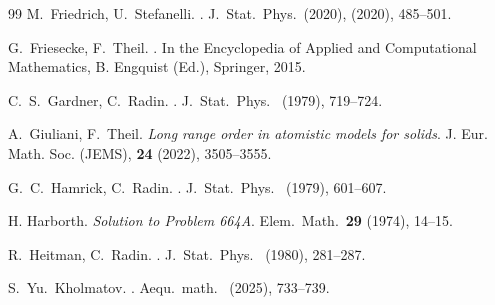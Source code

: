 \documentclass[reqno]{amsart}
\theoremstyle{plain}
\theoremstyle{definition}
\numberwithin{equation}{section}
\begin{document}
\begin{thebibliography}{99}
{\sc M.~Friedrich, U.~Stefanelli}. 
. 
\newblock J.\ Stat.\ Phys.\ (2020), 
 (2020),  485--501.

  




{\sc G.~Friesecke, F.~Theil}. 
. In the Encyclopedia of Applied and Computational Mathematics,
B. Engquist (Ed.), Springer, 2015.











 



{\sc C.~S.~Gardner, C.~Radin}. 
. 
\newblock J.\ Stat.\ Phys.\
 (1979), 719--724.


{\sc A.~Giuliani, F.~Theil}.
{\em Long range order in atomistic models for solids}.
J. Eur. Math. Soc. (JEMS), {\bf 24} (2022),  3505--3555. 



   
{\sc G.~C.~Hamrick, C.~Radin}. 
. 
\newblock J.\ Stat.\ Phys.\
\newblock {\bf 21} (1979), 601--607.
  




{\sc H. Harborth}. {\em Solution to Problem 664A}. Elem.\ Math.\ {\bf 29} (1974), 14--15.



{\sc  R.~Heitman, C.~Radin}. 
. 
\newblock J.\ Stat.\ Phys.\
 (1980), 281--287. 



 
  {\sc  S.\ Yu.\ Kholmatov}.
  .
  \newblock Aequ.\ math.\
   (2025), 733--739.

 



\end{thebibliography}
\end{document}
